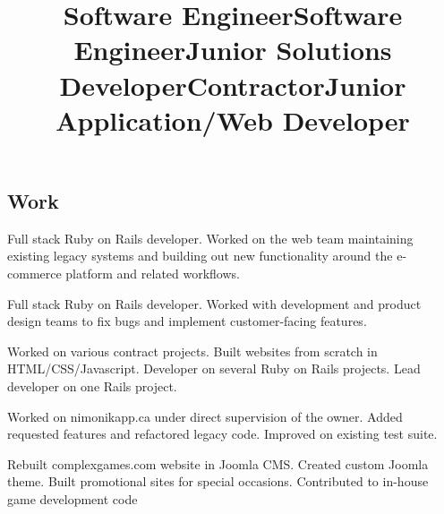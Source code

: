 \documentclass[margin,line,letterpaper]{resume}
\begin{document}
\begin{resume}
  \section{\mysidestyle Work}

  \title{\bf Software Engineer}
  \location{}
  \begin{position}
    Full stack Ruby on Rails developer. Worked on the web team
    maintaining existing legacy systems and building out new
    functionality around the e-commerce platform and related
    workflows.
  \end{position}

  \title{\bf Software Engineer}
  \location{}
  \begin{position}
    Full stack Ruby on Rails developer. Worked with development and
    product design teams to fix bugs and implement customer-facing
    features.
  \end{position}

  \title{\bf Junior Solutions Developer}
  \location{}
  \begin{position}
    Worked on various contract projects. Built websites from scratch
    in HTML/CSS/Javascript. Developer on several Ruby on Rails
    projects. Lead developer on one Rails project.
  \end{position}

  \title{\bf Contractor}
  \location{}
  \begin{position}
    Worked on nimonikapp.ca under direct supervision of the owner.
    Added requested features and refactored legacy code. Improved
    on existing test suite. 
  \end{position}

  \title{\bf Junior Application/Web Developer}
  \location{}
  \begin{position}
    Rebuilt complexgames.com website in Joomla CMS. Created custom
    Joomla theme. Built promotional sites for special occasions. 
    Contributed to in-house game development code
  \end{position}

\end{resume}
\end{document}
